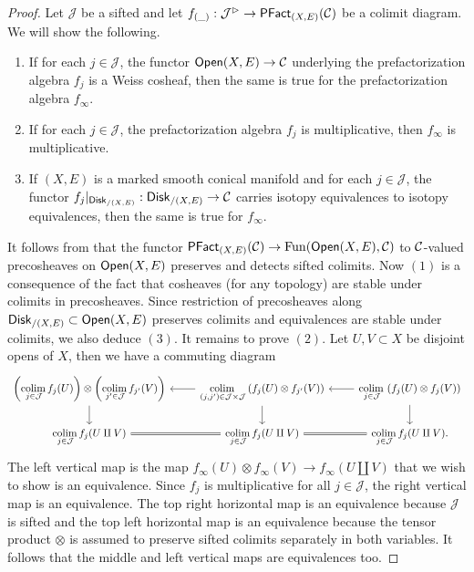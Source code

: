 \documentclass[10pt, reqno, twoside
, final
]{amsart}
\numberwithin{equation}{subsection}%
\theoremstyle{definition}
\theoremstyle{definition}
\theoremstyle{definition}
\theoremstyle{definition}
\theoremstyle{definition}
\theoremstyle{definition}
\theoremstyle{definition}
\theoremstyle{definition}
\theoremstyle{definition}
\theoremstyle{plain}
\theoremstyle{definition}
\theoremstyle{plain}
\theoremstyle{definition}
\theoremstyle{plain}
\theoremstyle{definition}
\theoremstyle{definition}
\theoremstyle{plain}
\theoremstyle{plain}
\theoremstyle{definition}
\theoremstyle{plain}
\theoremstyle{plain}
\theoremstyle{plain}
\begin{document}
\begin{proof}
Let $\mathcal{J}$ be a sifted \infcat and let $f_{(\_)}:\mathcal{J}^{\rhd}\rightarrow \mathsf{PFact}_{(X,E)}(\mathcal{C})$ be a colimit diagram. We will show the following.
\begin{enumerate}[$(1)$]
    \item If for each $j\in\mathcal{J}$, the functor $\mathsf{Open}(X,E)\rightarrow \mathcal{C}$ underlying the prefactorization algebra $f_j$ is a Weiss cosheaf, then the same is true for the prefactorization algebra $f_{\infty}$.
    \item If for each $j\in\mathcal{J}$, the prefactorization algebra $f_j$ is multiplicative, then $f_{\infty}$ is multiplicative.
    \item If $(X,E)$ is a marked smooth conical manifold and for each $j\in \mathcal{J}$, the functor $f_j|_{\mathsf{Disk}_{/(X,E)}}:\mathsf{Disk}_{/(X,E)}\rightarrow \mathcal{C}$ carries isotopy equivalences to isotopy equivalences, then the same is true for $f_{\infty}$.
\end{enumerate}
It follows from \cite[Theorem 3.2.3.1]{LurHA} that the functor $\mathsf{PFact}_{(X,E)}(\mathcal{C})\rightarrow \mathrm{Fun}(\mathsf{Open}(X,E),\mathcal{C})$ to $\mathcal{C}$-valued precosheaves on $\mathsf{Open}(X,E)$ preserves and detects sifted colimits. Now $(1)$ is a consequence of the fact that cosheaves (for any topology) are stable under colimits in precosheaves. Since restriction of precosheaves along $\mathsf{Disk}_{/(X,E)}\subset \mathsf{Open}(X,E)$ preserves colimits and equivalences are stable under colimits, we also deduce $(3)$. It remains to prove $(2)$. Let $U,V\subset X$ be disjoint opens of $X$, then we have a commuting diagram 
\[
\begin{tikzcd}
\left(\underset{j\in \mathcal{J}}{\colim} f_j(U)\right) \otimes\left(\underset{j'\in \mathcal{J}}{\colim} f_{j'}(V)\right)\ar[d] & \underset{(j,j')\in \mathcal{J}\times\mathcal{J}}{\colim} \left(f_j(U)\otimes f_{j'}(V)\right)  \ar[d]\ar[l] & \underset{j\in \mathcal{J}}{\colim} \left(f_j(U)\otimes f_{j}(V)\right) \ar[d] \ar[l]\\
 \underset{j\in \mathcal{J}}{\colim}  f_{j}(U\amalg V)\ar[r,equal]& \underset{j\in \mathcal{J}}{\colim}  f_{j}(U\amalg V)\ar[r,equal]&\underset{j\in \mathcal{J}}{\colim}  f_{j}(U\amalg V).
\end{tikzcd}
\]
The left vertical map is the map $f_{\infty}(U)\otimes f_{\infty}(V)\rightarrow f_{\infty}\left(U\amalg V\right)$ that we wish to show is an equivalence. Since $f_j$ is multiplicative for all $j\in\mathcal{J}$, the right vertical map is an equivalence. The top right horizontal map is an equivalence because $\mathcal{J}$ is sifted and the top left horizontal map is an equivalence because the tensor product $\otimes$ is assumed to preserve sifted colimits separately in both variables. It follows that the middle and left vertical maps are equivalences too. 
\end{proof}
\end{document}
